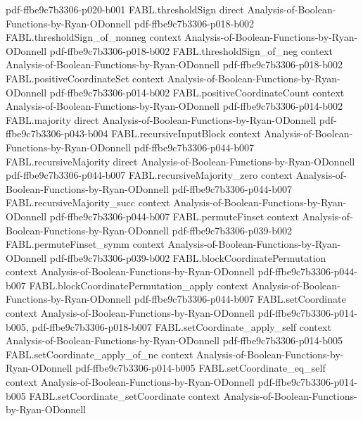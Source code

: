 \begin{theorem}
  {pdf-ffbe9c7b3306-p020-b001}
\proofstep
  {FABL.thresholdSign}
  {direct}
  {Analysis-of-Boolean-Functions-by-Ryan-ODonnell}
  {pdf-ffbe9c7b3306-p018-b002}
\proofstep
  {FABL.thresholdSign_of_nonneg}
  {context}
  {Analysis-of-Boolean-Functions-by-Ryan-ODonnell}
  {pdf-ffbe9c7b3306-p018-b002}
\proofstep
  {FABL.thresholdSign_of_neg}
  {context}
  {Analysis-of-Boolean-Functions-by-Ryan-ODonnell}
  {pdf-ffbe9c7b3306-p018-b002}
\proofstep
  {FABL.positiveCoordinateSet}
  {context}
  {Analysis-of-Boolean-Functions-by-Ryan-ODonnell}
  {pdf-ffbe9c7b3306-p014-b002}
\proofstep
  {FABL.positiveCoordinateCount}
  {context}
  {Analysis-of-Boolean-Functions-by-Ryan-ODonnell}
  {pdf-ffbe9c7b3306-p014-b002}
\proofstep
  {FABL.majority}
  {direct}
  {Analysis-of-Boolean-Functions-by-Ryan-ODonnell}
  {pdf-ffbe9c7b3306-p043-b004}
\proofstep
  {FABL.recursiveInputBlock}
  {context}
  {Analysis-of-Boolean-Functions-by-Ryan-ODonnell}
  {pdf-ffbe9c7b3306-p044-b007}
\proofstep
  {FABL.recursiveMajority}
  {direct}
  {Analysis-of-Boolean-Functions-by-Ryan-ODonnell}
  {pdf-ffbe9c7b3306-p044-b007}
\proofstep
  {FABL.recursiveMajority_zero}
  {context}
  {Analysis-of-Boolean-Functions-by-Ryan-ODonnell}
  {pdf-ffbe9c7b3306-p044-b007}
\proofstep
  {FABL.recursiveMajority_succ}
  {context}
  {Analysis-of-Boolean-Functions-by-Ryan-ODonnell}
  {pdf-ffbe9c7b3306-p044-b007}
\proofstep
  {FABL.permuteFinset}
  {context}
  {Analysis-of-Boolean-Functions-by-Ryan-ODonnell}
  {pdf-ffbe9c7b3306-p039-b002}
\proofstep
  {FABL.permuteFinset_symm}
  {context}
  {Analysis-of-Boolean-Functions-by-Ryan-ODonnell}
  {pdf-ffbe9c7b3306-p039-b002}
\proofstep
  {FABL.blockCoordinatePermutation}
  {context}
  {Analysis-of-Boolean-Functions-by-Ryan-ODonnell}
  {pdf-ffbe9c7b3306-p044-b007}
\proofstep
  {FABL.blockCoordinatePermutation_apply}
  {context}
  {Analysis-of-Boolean-Functions-by-Ryan-ODonnell}
  {pdf-ffbe9c7b3306-p044-b007}
\proofstep
  {FABL.setCoordinate}
  {context}
  {Analysis-of-Boolean-Functions-by-Ryan-ODonnell}
  {pdf-ffbe9c7b3306-p014-b005,
    pdf-ffbe9c7b3306-p018-b007}
\proofstep
  {FABL.setCoordinate_apply_self}
  {context}
  {Analysis-of-Boolean-Functions-by-Ryan-ODonnell}
  {pdf-ffbe9c7b3306-p014-b005}
\proofstep
  {FABL.setCoordinate_apply_of_ne}
  {context}
  {Analysis-of-Boolean-Functions-by-Ryan-ODonnell}
  {pdf-ffbe9c7b3306-p014-b005}
\proofstep
  {FABL.setCoordinate_eq_self}
  {context}
  {Analysis-of-Boolean-Functions-by-Ryan-ODonnell}
  {pdf-ffbe9c7b3306-p014-b005}
\proofstep
  {FABL.setCoordinate_setCoordinate}
  {context}
  {Analysis-of-Boolean-Functions-by-Ryan-ODonnell}

\end{theorem}
